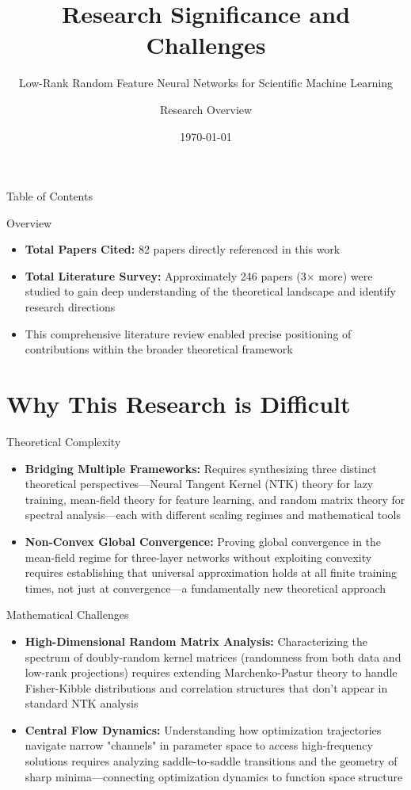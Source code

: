 \documentclass[aspectratio=169]{beamer}
\title{Research Significance and Challenges}
\subtitle{Low-Rank Random Feature Neural Networks for Scientific Machine Learning}
\author{Research Overview}
\date{\today}
\begin{document}
\frame{\titlepage}

\begin{frame}{Table of Contents}
\tableofcontents[pausesections]
\end{frame}

\begin{frame}{Overview}
\begin{itemize}
\item \textbf{Total Papers Cited:} 82 papers directly referenced in this work
\item \textbf{Total Literature Survey:} Approximately 246 papers (3$\times$ more) were studied to gain deep understanding of the theoretical landscape and identify research directions
\item This comprehensive literature review enabled precise positioning of contributions within the broader theoretical framework
\end{itemize}
\end{frame}

\section{Why This Research is Difficult}

\begin{frame}{Theoretical Complexity}
\begin{itemize}
\item \textbf{Bridging Multiple Frameworks:} Requires synthesizing three distinct theoretical perspectives—Neural Tangent Kernel (NTK) theory for lazy training, mean-field theory for feature learning, and random matrix theory for spectral analysis—each with different scaling regimes and mathematical tools
\item \textbf{Non-Convex Global Convergence:} Proving global convergence in the mean-field regime for three-layer networks without exploiting convexity requires establishing that universal approximation holds at all finite training times, not just at convergence—a fundamentally new theoretical approach
\end{itemize}
\end{frame}

\begin{frame}{Mathematical Challenges}
\begin{itemize}
\item \textbf{High-Dimensional Random Matrix Analysis:} Characterizing the spectrum of doubly-random kernel matrices (randomness from both data and low-rank projections) requires extending Marchenko-Pastur theory to handle Fisher-Kibble distributions and correlation structures that don't appear in standard NTK analysis
\item \textbf{Central Flow Dynamics:} Understanding how optimization trajectories navigate narrow "channels" in parameter space to access high-frequency solutions requires analyzing saddle-to-saddle transitions and the geometry of sharp minima—connecting optimization dynamics to function space structure
\end{itemize}
\end{frame}
\end{document}
